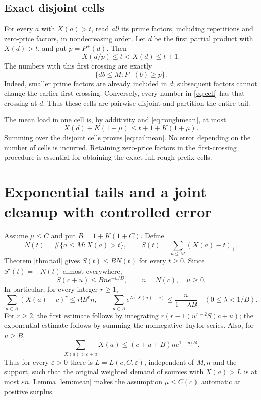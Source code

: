 \documentclass[11pt,a4paper]{article}
\newcommand{\pos}[1]{\left(#1\right)_+}
\begin{document}
\subsection*{Exact disjoint cells}
For every $a$ with $X(a)>t$, read \emph{all} its prime factors,
including repetitions and zero-price factors, in nondecreasing order.
Let $d$ be the first partial product with $X(d)>t$, and put
$p=P^+(d)$. Then
\[
 X(d/p)\le t<X(d)\le t+1.
\]
The numbers with this first crossing are exactly
\begin{equation}
 \{db\le M:P^-(b)\ge p\}.                             \label{eq:cell}
\end{equation}
Indeed, smaller prime factors are already included in $d$; subsequent
factors cannot change the earlier first crossing. Conversely, every
number in \eqref{eq:cell} has that crossing at $d$. Thus these cells
are pairwise disjoint and partition the entire tail.

The mean load in one cell is, by additivity and \eqref{eq:roughmean},
at most
\[
 X(d)+K(1+\mu)\le t+1+K(1+\mu).
\]
Summing over the disjoint cells proves \eqref{eq:tailmean}. No error
depending on the number of cells is incurred. Retaining zero-price
factors in the first-crossing procedure is essential for obtaining the
exact full rough-prefix cells.

\section{Exponential tails and a joint cleanup with controlled error}

Assume $\mu\le C$ and put $B=1+K(1+C)$. Define
\[
 N(t)=\#\{a\le M:X(a)>t\},\qquad
 S(t)=\sum_{a\le M}\pos{X(a)-t}.
\]
Theorem \ref{thm:tail} gives $S(t)\le BN(t)$ for every $t\ge0$.
Since $S'(t)=-N(t)$ almost everywhere,
\begin{equation}
 S(c+u)\le Bn e^{-u/B},\qquad n=N(c),\quad u\ge0.       \label{eq:exptail}
\end{equation}
In particular, for every integer $r\ge1$,
\[
 \sum_{a\in A}(X(a)-c)^r\le r!B^rn,
 \qquad
 \sum_{a\in A}e^{\lambda(X(a)-c)}\le\frac n{1-\lambda B}
 \quad(0\le\lambda<1/B).
\]
For $r\ge2$, the first estimate follows by integrating
$r(r-1)u^{r-2}S(c+u)$; the exponential estimate follows by summing
the nonnegative Taylor series. Also, for $u\ge B$,
\begin{equation}
 \sum_{X(a)>c+u}X(a)
 \le(c+u+B)n e^{1-u/B}.                               \label{eq:weightedtail}
\end{equation}
Thus for every $\varepsilon>0$ there is
$L=L(c,C,\varepsilon)$, independent of $M,n$ and the support, such that
the original weighted demand of sources with $X(a)>L$ is at most
$\varepsilon n$. Lemma \ref{lem:mean} makes the assumption
$\mu\le C(c)$ automatic at positive surplus.
\end{document}
